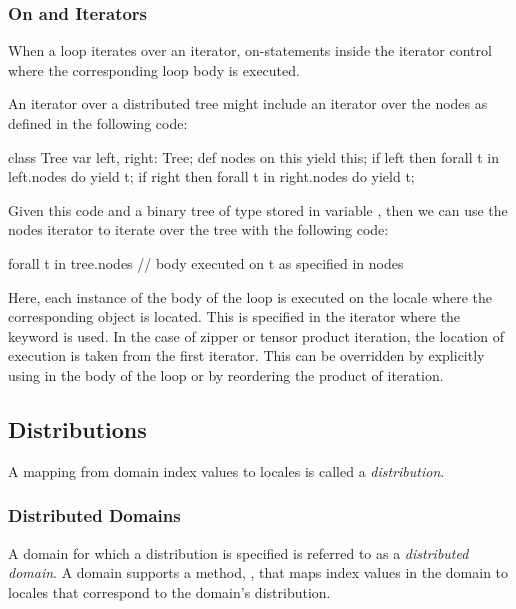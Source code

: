 \subsubsection{On and Iterators}
\label{On_and_Iterators}

When a loop iterates over an iterator, on-statements inside the
iterator control where the corresponding loop body is executed.

\begin{example}
An iterator over a distributed tree might include an iterator over the
nodes as defined in the following code:
\begin{chapel}
class Tree {
  var left, right: Tree;
  def nodes {
    on this yield this;
    if left then
      forall t in left.nodes do
        yield t;
    if right then
      forall t in right.nodes do
        yield t;
  }
}
\end{chapel}
Given this code and a binary tree of type  stored in
variable , then we can use the nodes iterator to iterate
over the tree with the following code:
\begin{chapel}
forall t in tree.nodes {
  // body executed on t as specified in nodes
}
\end{chapel}
Here, each instance of the body of the  loop is executed
on the locale where the corresponding object  is located.
This is specified in the  iterator where the 
keyword is used.  In the case of zipper or tensor product iteration,
the location of execution is taken from the first iterator.  This can
be overridden by explicitly using  in the body of the loop or
by reordering the product of iteration.
\end{example}

\subsection{Distributions}
\label{Distributions}

A mapping from domain index values to locales is called a {\em
distribution}.

\subsubsection{Distributed Domains}
\label{Distributed_Domains}

A domain for which a distribution is specified is referred to as a
{\em distributed domain}.  A domain supports a method, ,
that maps index values in the domain to locales that correspond to the
domain's distribution.

